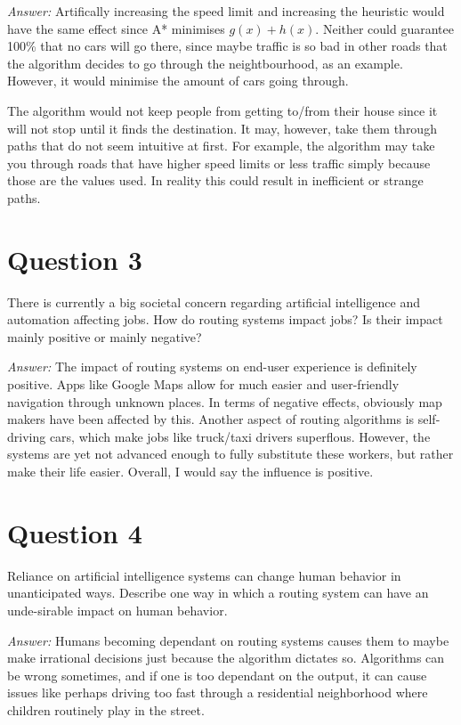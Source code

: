 \documentclass{article}
\begin{document}
\textit{Answer:}
Artifically increasing the speed limit and increasing the heuristic would have the same effect
since A* minimises $g(x)+h(x)$. Neither could guarantee 100\% that no cars will go there,
since maybe traffic is so bad in other roads that the algorithm decides to go through the
neightbourhood, as an example. However, it would minimise the amount of cars going through.

The algorithm would not keep people from getting to/from their house since it will not stop
until it finds the destination. It may, however, take them through paths that do not seem
intuitive at first. For example, the algorithm may take you through roads that have
higher speed limits or less traffic simply because those are the values used. In reality
this could result in inefficient or strange paths.

\section*{Question 3}
There is currently a big societal concern regarding artificial intelligence and automation affecting jobs.
How do routing systems impact jobs? Is their impact mainly positive or mainly negative?

\textit{Answer:}
The impact of routing systems on end-user experience is definitely positive. Apps like Google Maps
allow for much easier and user-friendly navigation through unknown places. In terms of negative
effects, obviously map makers have been affected by this. Another aspect of routing algorithms
is self-driving cars, which make jobs like truck/taxi drivers superflous. However, the systems
are yet not advanced enough to fully substitute these workers, but rather make their life easier.
Overall, I would say the influence is positive.

\section*{Question 4}
Reliance on artificial intelligence systems can change human behavior in unanticipated ways.
Describe one way in which a routing system can have an unde-sirable impact on human behavior.

\textit{Answer:}
Humans becoming dependant on routing systems causes them to maybe make irrational decisions
just because the algorithm dictates so. Algorithms can be wrong sometimes, and if one is too
dependant on the output, it can cause issues like perhaps driving too fast through a
residential neighborhood where children routinely play in the street.
\end{document}
